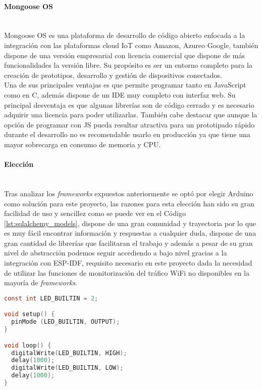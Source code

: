 \documentclass[../proyecto.tex]{subfiles}
\begin{document}
\paragraph{Mongoose OS}\mbox{}\\
Mongoose OS es una plataforma de desarrollo de código abierto enfocada a la integración con las plataformas cloud IoT como Amazon, Azureo Google, también dispone de una versión empresarial con licencia comercial que dispone de más funcionalidades la versión libre. Su propósito es ser un entorno completo para la creación de prototipos, desarrollo y gestión de dispositivos conectados.\\

Una de sus principales ventajas es que permite programar tanto en JavaScript como en C, además dispone de un IDE muy completo con interfaz web. Su principal desventaja es que algunas librerías son de código cerrado y es necesario adquirir una licencia para poder utilizarlas. También cabe destacar que aunque la opción de programar con JS pueda resultar atractiva para un prototipado rápido durante el desarrollo no es recomendable usarlo en producción ya que tiene una mayor sobrecarga en consumo de memoria y CPU.\\

\paragraph{Elección}\mbox{}\\

Tras analizar los \textit{frameworks} expuestos anteriormente se optó por elegir Arduino como solución para este proyecto, las razones para esta elección han sido su gran facilidad de uso y sencillez como se puede ver en el Código \ref{lst:sqlalchemy_models}, dispone de una gran comunidad y trayectoria por lo que es muy fácil encontrar información y respuestas a cualquier duda, dispone de una gran cantidad de librerías que facilitaran el trabajo y además a pesar de su gran nivel de abstracción podemos seguir accediendo a bajo nivel gracias a la integración con ESP-IDF, requisito necesario en este proyecto dada la necesidad de utilizar las funciones de monitorización del tráfico WiFi no disponibles en la mayoría de \textit{frameworks}.\\

\begin{minipage}{\linewidth}
\begin{lstlisting}[language=C, caption=Ejemplo de código para hacer parpadear un led con Arduino, captionpos=b, frame=single, label={lst:arduino_example}]
const int LED_BUILTIN = 2;

void setup() {
  pinMode (LED_BUILTIN, OUTPUT);
}

void loop() {
  digitalWrite(LED_BUILTIN, HIGH);
  delay(1000);
  digitalWrite(LED_BUILTIN, LOW);
  delay(1000);
}
\end{lstlisting}
\end{minipage}
\end{document}
